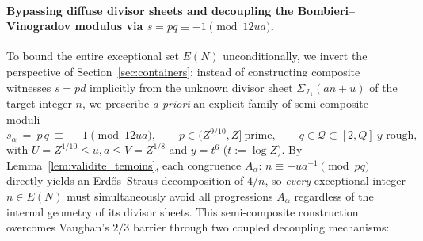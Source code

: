 \documentclass[11pt, a4paper]{article}
\theoremstyle{plain}
\theoremstyle{definition}
\begin{document}
\paragraph{Bypassing diffuse divisor sheets and decoupling the Bombieri--Vinogradov modulus via $s=pq\equiv-1\pmod{12ua}$.}
To bound the entire exceptional set $E(N)$ unconditionally, we invert the perspective of Section~\ref{sec:containers}: instead of constructing composite witnesses $s=pd$ implicitly from the unknown divisor sheet $\Sigma_{\mathcal{I}_1}(an+u)$ of the target integer $n$, we prescribe \emph{a priori} an explicit family of semi-composite moduli
$$s_\alpha\ =\ p\,q\ \equiv\ -1\pmod{12ua},\qquad p\in(Z^{9/10},Z]\ \text{prime},\qquad q\in\mathcal{Q}\subset[2,Q]\ \text{$y$-rough},$$
with $U=Z^{1/10}\le u,a\le V=Z^{1/8}$ and $y=t^{6}$ ($t:=\log Z$). By Lemma~\ref{lem:validite_temoins}, each congruence $A_\alpha:\,n\equiv -ua^{-1}\pmod{pq}$ directly yields an Erd\H{o}s--Straus decomposition of $4/n$, so \emph{every} exceptional integer $n\in E(N)$ must simultaneously avoid all progressions $A_\alpha$ regardless of the internal geometry of its divisor sheets. This semi-composite construction overcomes Vaughan's $2/3$ barrier through two coupled decoupling mechanisms:
\end{document}
